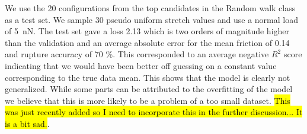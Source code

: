 We use the 20 configurations from the top candidates in the Random walk class as a test set. We sample 30 pseudo uniform stretch values and use a normal load of \SI{5}{nN}. The test set gave a loss 2.13 which is two orders of magnitude higher than the validation and an average absolute error for the mean friction of 0.14 and rupture accuracy of 70 \%. This corresponded to an average negative $R^2$ score indicating that we would have been better off guessing on a constant value corresponding to the true data mean. This shows that the model is clearly not generalized. While some parts can be attributed to the overfitting of the model we believe that this is more likely to be a problem of a too small dataset. \hl{This was just recently added so I need to incorporate this in the further discussion... It is a bit sad.}. 



